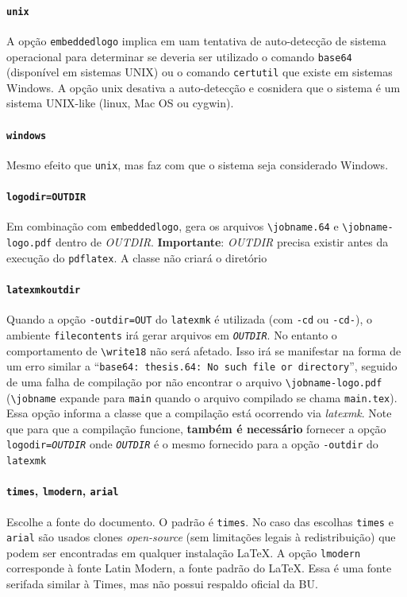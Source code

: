 \documentclass[embeddedlogo]{ufsc-thesis-rn46-2019}
\newcommand{\lacmd}[1]{\texttt{\textbackslash{}#1}}
\begin{document}
\paragraph*{\texttt{unix}} A opção \texttt{embeddedlogo} implica em uam
tentativa de auto-detecção de sistema operacional para determinar se deveria ser
utilizado o comando \texttt{base64} (disponível em sistemas UNIX) ou o comando
\texttt{certutil} que existe em sistemas Windows. A opção unix desativa a
auto-detecção e cosnidera que o sistema é um sistema UNIX-like (linux, Mac OS ou
cygwin).

\paragraph*{\texttt{windows}} Mesmo efeito que \texttt{unix}, mas faz com que o
sistema seja considerado Windows.

{\sloppy
\paragraph*{\texttt{logodir=OUTDIR}} Em combinação com \texttt{embeddedlogo},
gera os arquivos \lacmd{jobname.64} e \lacmd{jobname-logo.pdf} dentro de
\emph{OUTDIR}. \textbf{Importante}: \emph{OUTDIR} precisa existir antes da
execução do \texttt{pdflatex}. A classe não criará o diretório
\par}

\paragraph*{\texttt{latexmkoutdir}} Quando a opção \texttt{-outdir=OUT} do
\texttt{latexmk} é utilizada (com \texttt{-cd} ou \texttt{-cd-}), o ambiente
\texttt{filecontents} irá gerar arquivos em \texttt{\emph{OUTDIR}}. No entanto o
comportamento de \lacmd{write18} não será afetado. Isso irá se manifestar na forma de
um erro similar a ``\texttt{base64: thesis.64: No such file or directory}'',
seguido de uma falha de compilação por não encontrar o arquivo
\lacmd{jobname-logo.pdf} (\lacmd{jobname} expande para \texttt{main} quando o
arquivo compilado se chama \texttt{main.tex}). Essa opção informa a classe que a
compilação está ocorrendo via \emph{latexmk}. Note que para que a compilação
funcione, \textbf{também é necessário} fornecer a opção
\texttt{logodir=\emph{OUTDIR}} onde \texttt{\emph{OUTDIR}} é o mesmo fornecido
para a opção \texttt{-outdir} do \texttt{latexmk}

\paragraph*{\texttt{times}, \texttt{lmodern}, \texttt{arial}} Escolhe a fonte
do documento. O padrão é \texttt{times}. No caso das escolhas \texttt{times} e
\texttt{arial} são usados clones \emph{open-source} (sem limitações legais à
redistribuição) que podem ser encontradas em qualquer instalação \LaTeX. A
opção \texttt{lmodern} corresponde à fonte Latin Modern, a fonte padrão do
\LaTeX. Essa é uma fonte serifada similar à Times, mas não possui respaldo
oficial da BU.
\end{document}
